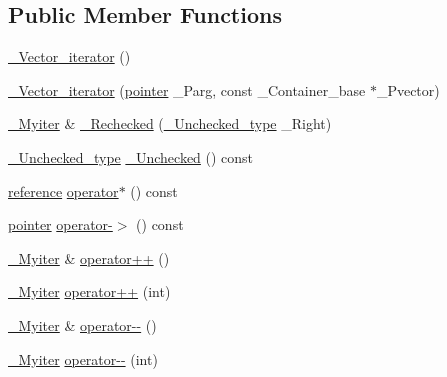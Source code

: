 \subsection*{Public Member Functions}
\begin{DoxyCompactItemize}
\item 
\hyperlink{class___vector__iterator_a9fc76d6179a75914582b7200686831bb}{\+\_\+\+Vector\+\_\+iterator} ()
\item 
\hyperlink{class___vector__iterator_a9cd2942135f3dac16a87780426359097}{\+\_\+\+Vector\+\_\+iterator} (\hyperlink{class___vector__const__iterator_a301a1187c227c820bd86335496229e6a}{pointer} \+\_\+\+Parg, const \+\_\+\+Container\+\_\+base $\ast$\+\_\+\+Pvector)
\item 
\hyperlink{class___vector__const__iterator_ac41cce1a95dfa665c2d7237fd94d776b}{\+\_\+\+Myiter} \& \hyperlink{class___vector__iterator_acefd479aa8f5896943bdd945f8acc42f}{\+\_\+\+Rechecked} (\hyperlink{class___vector__const__iterator_a17897ed20e5a6c25f9b383d0f0a4bb9d}{\+\_\+\+Unchecked\+\_\+type} \+\_\+\+Right)
\item 
\hyperlink{class___vector__const__iterator_a17897ed20e5a6c25f9b383d0f0a4bb9d}{\+\_\+\+Unchecked\+\_\+type} \hyperlink{class___vector__iterator_ad65487fdb21c5884dbfac53a8c6ad374}{\+\_\+\+Unchecked} () const 
\item 
\hyperlink{class___vector__const__iterator_ad622d2f855c02a5b3b2f49f39cbbabf4}{reference} \hyperlink{class___vector__iterator_a383ffeb3f02911746695882f9eaf30e7}{operator$\ast$} () const 
\item 
\hyperlink{class___vector__const__iterator_a301a1187c227c820bd86335496229e6a}{pointer} \hyperlink{class___vector__iterator_a96df6099708efb35589933c5daeb0bea}{operator-\/$>$} () const 
\item 
\hyperlink{class___vector__const__iterator_ac41cce1a95dfa665c2d7237fd94d776b}{\+\_\+\+Myiter} \& \hyperlink{class___vector__iterator_a9171d2ff57d806f4468f9cea0eda6ad8}{operator++} ()
\item 
\hyperlink{class___vector__const__iterator_ac41cce1a95dfa665c2d7237fd94d776b}{\+\_\+\+Myiter} \hyperlink{class___vector__iterator_a99fb2657716d84e921cbb984ab594733}{operator++} (int)
\item 
\hyperlink{class___vector__const__iterator_ac41cce1a95dfa665c2d7237fd94d776b}{\+\_\+\+Myiter} \& \hyperlink{class___vector__iterator_ad5103b4825d1b3c2b50273940b3b6613}{operator-\/-\/} ()
\item 
\hyperlink{class___vector__const__iterator_ac41cce1a95dfa665c2d7237fd94d776b}{\+\_\+\+Myiter} \hyperlink{class___vector__iterator_a935b4c4f379d2ea763361857e6bb63ac}{operator-\/-\/} (int)

\end{DoxyCompactItemize}
